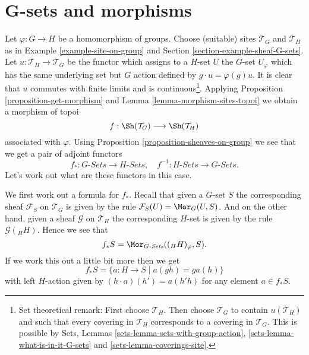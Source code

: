 \section{G-sets and morphisms}
\label{section-G-sets-morphisms}

\noindent
Let $\varphi : G \to H$ be a homomorphism of groups.
Choose (suitable) sites $\mathcal{T}_G$ and $\mathcal{T}_H$ as in
Example \ref{example-site-on-group} and
Section \ref{section-example-sheaf-G-sets}.
Let $u : \mathcal{T}_H \to \mathcal{T}_G$ be the functor which assigns
to a $H$-set $U$ the $G$-set $U_\varphi$ which has the same underlying
set but $G$ action defined by $g \cdot u = \varphi(g)u$.
It is clear that $u$ commutes with finite limits and is
continuous\footnote{Set theoretical remark: First choose $\mathcal{T}_H$.
Then choose $\mathcal{T}_G$ to contain $u(\mathcal{T}_H)$ and such that
every covering in $\mathcal{T}_H$ corresponds to a covering in
$\mathcal{T}_G$. This is possible by
Sets, Lemmas
\ref{sets-lemma-sets-with-group-action},
\ref{sets-lemma-what-is-in-it-G-sets} and
\ref{sets-lemma-coverings-site}.}.
Applying
Proposition \ref{proposition-get-morphism}
and
Lemma \ref{lemma-morphism-sites-topoi}
we obtain a morphism of topoi
$$
f : \Sh(\mathcal{T}_G) \longrightarrow \Sh(\mathcal{T}_H)
$$
associated with $\varphi$. Using
Proposition \ref{proposition-sheaves-on-group}
we see that we get a pair of adjoint functors
$$
f_* : G\textit{-Sets} \longrightarrow H\textit{-Sets}, \quad
f^{-1} : H\textit{-Sets} \longrightarrow G\textit{-Sets}.
$$
Let's work out what are these functors in this case.

\medskip\noindent
We first work out a formula for $f_*$.
Recall that given a $G$-set $S$ the corresponding sheaf
$\mathcal{F}_S$ on $\mathcal{T}_G$ is given by the rule
$\mathcal{F}_S(U) = \Mor_G(U, S)$. And on the other hand, given
a sheaf $\mathcal{G}$ on $\mathcal{T}_H$ the corresponding $H$-set
is given by the rule $\mathcal{G}({}_HH)$. Hence we see that
$$
f_*S = \Mor_{G\textit{-Sets}}(({}_HH)_\varphi, S).
$$
If we work this out a little bit more then we get
$$
f_*S = \{ a : H \to S \mid a(gh) = ga(h) \}
$$
with left $H$-action given by
$(h \cdot a)(h') = a(h'h)$
for any element $a \in f_*S$.

